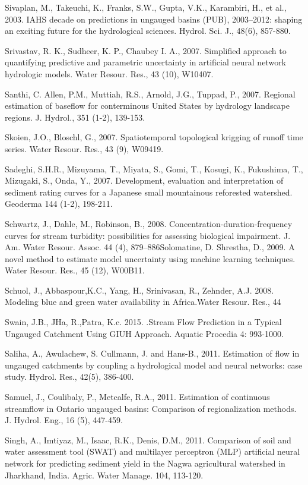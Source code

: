 \begin{hangingpar}{2em}
Sivaplan, M., Takeuchi, K., Franks, S.W., Gupta, V.K., Karambiri, H., et al., 2003. IAHS decade on predictions in ungauged basins (PUB), 2003–2012: shaping an exciting future for the hydrological sciences. Hydrol. Sci. J., 48(6), 857-880.

Srivastav, R. K., Sudheer, K. P., Chaubey I. A., 2007. Simplified approach to quantifying predictive and parametric uncertainty in artificial neural network hydrologic models. Water Resour. Res., 43 (10), W10407.

Santhi, C. Allen, P.M., Muttiah, R.S., Arnold, J.G., Tuppad, P., 2007. Regional estimation of baseflow for conterminous United States by hydrology landscape regions. J. Hydrol., 351 (1-2), 139-153.

Skoien, J.O., Bloschl, G., 2007. Spatiotemporal topological krigging of runoff time series. Water Resour. Res., 43 (9), W09419. 

Sadeghi, S.H.R., Mizuyama, T., Miyata, S., Gomi, T., Kosugi, K., Fukushima, T., Mizugaki, S., Onda, Y., 2007. Development, evaluation and interpretation of sediment rating curves for a Japanese small mountainous reforested watershed. Geoderma 144 (1-2), 198-211.

Schwartz, J., Dahle, M., Robinson, B., 2008. Concentration-duration-frequency curves for stream turbidity: possibilities for assessing biological impairment. J. Am. Water Resour. Assoc. 44 (4), 879–886Solomatine, D.  Shrestha, D., 2009. A novel method to estimate model uncertainty using machine learning techniques. Water Resour. Res., 45 (12), W00B11.

Schuol, J.,  Abbaspour,K.C.,  Yang, H.,  Srinivasan, R.,  Zehnder, A.J. 2008.  Modeling blue and green water availability in Africa.Water Resour. Res., 44 

Swain, J.B., JHa, R.,Patra, K.c. 2015. .Stream Flow Prediction in a Typical Ungauged Catchment Using GIUH Approach. Aquatic Procedia 4: 993-1000.

Saliha, A., Awulachew, S. Cullmann, J. and Hans-B., 2011.  Estimation of flow in ungauged catchments by coupling a hydrological model and neural networks: case study. Hydrol. Res., 42(5), 386-400.

Samuel, J., Coulibaly, P., Metcalfe, R.A., 2011. Estimation of continuous streamflow in Ontario ungauged basins: Comparison of regionalization methods. J. Hydrol. Eng., 16 (5), 447-459.

Singh, A., Imtiyaz, M., Isaac, R.K., Denis, D.M., 2011. Comparison of soil and water assessment tool (SWAT) and multilayer perceptron (MLP) artificial neural network for predicting sediment yield in the Nagwa agricultural watershed in Jharkhand, India. Agric. Water Manage. 104, 113-120.


\end{hangingpar}
